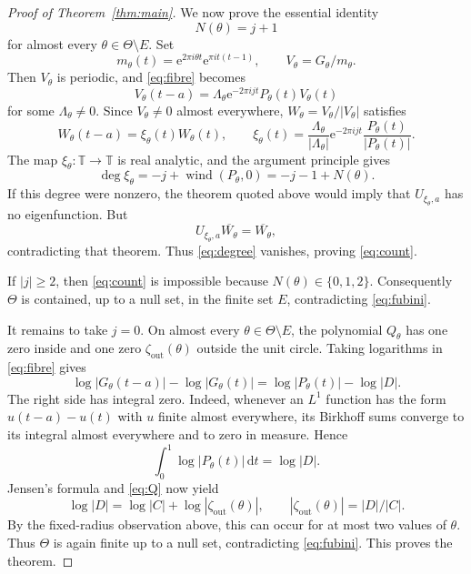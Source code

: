 \documentclass[10pt]{amsart}
\newcommand{\T}{\mathbb T}
\newcommand{\e}{\mathrm e}
\newcommand{\dd}{\,\mathrm d}
\DeclareMathOperator{\wind}{wind}
\begin{document}
\begin{proof}[Proof of Theorem~\ref{thm:main}]
We now prove the essential identity
\begin{equation}\label{eq:count}
N(\theta)=j+1
\end{equation}
for almost every $\theta\in\Theta\setminus E$. Set
\[
m_\theta(t)=\e^{2\pi i\theta t}\e^{\pi it(t-1)},
\qquad V_\theta=G_\theta/m_\theta.
\]
Then $V_\theta$ is periodic, and \eqref{eq:fibre} becomes
\[
V_\theta(t-a)=\Lambda_\theta\e^{-2\pi ijt}P_\theta(t)V_\theta(t)
\]
for some $\Lambda_\theta\neq0$. Since $V_\theta\neq0$ almost everywhere,
$W_\theta=V_\theta/|V_\theta|$ satisfies
\[
W_\theta(t-a)=\xi_\theta(t)W_\theta(t),
\qquad
\xi_\theta(t)=\frac{\Lambda_\theta}{|\Lambda_\theta|}\e^{-2\pi ijt}
\frac{P_\theta(t)}{|P_\theta(t)|}.
\]
The map $\xi_\theta:\T\to\T$ is real analytic, and the argument principle gives
\begin{equation}\label{eq:degree}
\deg\xi_\theta=-j+\wind(P_\theta,0)=-j-1+N(\theta).
\end{equation}
If this degree were nonzero, the theorem quoted above would imply that $U_{\xi_\theta,a}$
has no eigenfunction. But
\[
U_{\xi_\theta,a}\overline{W_\theta}=\overline{W_\theta},
\]
contradicting that theorem. Thus \eqref{eq:degree} vanishes, proving \eqref{eq:count}.

If $|j|\ge2$, then \eqref{eq:count} is impossible because $N(\theta)\in\{0,1,2\}$.
Consequently $\Theta$ is contained, up to a null set, in the finite set $E$, contradicting
\eqref{eq:fubini}.

It remains to take $j=0$. On almost every $\theta\in\Theta\setminus E$, the polynomial
$Q_\theta$ has one zero inside and one zero $\zeta_{\mathrm{out}}(\theta)$ outside the unit
circle. Taking logarithms in \eqref{eq:fibre} gives
\[
\log|G_\theta(t-a)|-\log|G_\theta(t)|
=\log|P_\theta(t)|-\log|D|.
\]
The right side has integral zero. Indeed, whenever an $L^1$ function has the form
$u(t-a)-u(t)$ with $u$ finite almost everywhere, its Birkhoff sums converge to its integral
almost everywhere and to zero in measure. Hence
\begin{equation}\label{eq:mean}
\int_0^1\log|P_\theta(t)|\dd t=\log|D|.
\end{equation}
Jensen's formula and \eqref{eq:Q} now yield
\[
\log|D|=\log|C|+\log|\zeta_{\mathrm{out}}(\theta)|,
\qquad
|\zeta_{\mathrm{out}}(\theta)|=|D|/|C|.
\]
By the fixed-radius observation above, this can occur for at most two values of $\theta$.
Thus $\Theta$ is again finite up to a null set, contradicting \eqref{eq:fubini}. This proves
the theorem.
\end{proof}
\end{document}

